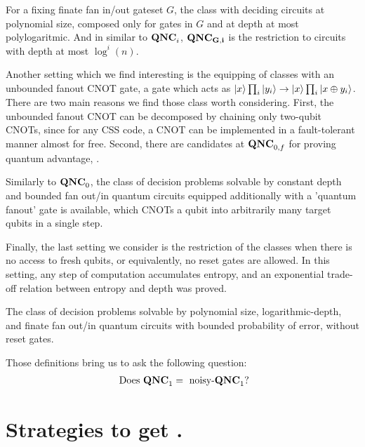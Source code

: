 \documentclass[manuscript,screen,review]{acmart}
\begin{document}
{\begin{definition}[$\QNCG{}$]
  For a fixing finate fan in/out gateset $G$, the class with deciding circuits at polynomial size, composed only for gates in $G$ and at depth at most polylogaritmic. And in similar to $\mathbf{QNC}_{i}{}$, $\mathbf{QNC_{G,i}}{}$ is the restriction to circuits with depth at most $\log^{i}(n)$.  
\end{definition}

Another setting which we find interesting is the equipping of classes with an unbounded fanout CNOT gate, a gate which acts as $\ket{x}\prod_{i}\ket{y_{i}} \rightarrow \ket{x}\prod_{i}\ket{x \oplus y_{i}}$. There are two main reasons we find those class worth considering. First, the unbounded fanout CNOT can be decomposed by chaining only two-qubit CNOTs, since for any CSS code, a CNOT can be implemented in a fault-tolerant manner almost for free. Second, there are candidates at $\mathbf{QNC}_{0,f}$ for proving quantum advantage\cite{Bremner_2017}, \cite{Paletta_2024}.


\begin{definition}[$\QNCzef{}$] 
Similarly to $\mathbf{QNC}_{0}{}$, the class of decision problems solvable by constant depth and bounded fan out/in quantum circuits equipped additionally with a 'quantum fanout' gate is available, which CNOTs a qubit into arbitrarily many target qubits in a single step.
\end{definition}

Finally, the last setting we consider is the restriction of the classes when there is no access to fresh qubits, or equivalently, no reset gates are allowed. In this setting, any step of computation accumulates entropy, and an exponential trade-off relation between entropy and depth was proved.

\begin{definition}
  The class of decision problems solvable by polynomial size,  logarithmic-depth, and finate fan out/in quantum circuits with bounded probability of error, without reset gates.
\end{definition}
Those definitions bring us to ask the following question:
\begin{equation*}
  \begin{split}
    \text{ Does } \mathbf{QNC}_{1}{} = \text{ noisy-}\mathbf{QNC}_{1}{} \text{?}
  \end{split}
\end{equation*}


\newpage
  \section{ Strategies to get \CDO. }  \label{sec:opt}
 
}
\end{document}

